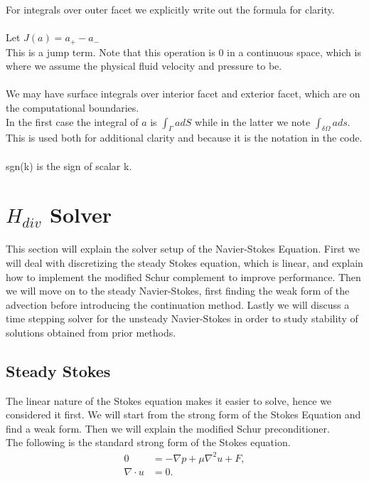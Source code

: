 \documentclass[11pt,twoside,a4paper]{article}
\begin{document}
For integrals over outer facet we explicitly write out the formula for clarity.\\
\\
Let $J(a) = a_+ - a_-$\\
This is a jump term. Note that this operation is $0$ in a continuous space, which is where we assume the physical fluid velocity and pressure to be.\\
\\
We may have surface integrals over interior facet and exterior facet, which are on the computational boundaries.\\
In the first case the integral of $a$ is $\int_\Gamma a dS$ while in the latter we note $\int_{\delta \Omega} a ds$.\\
This is used both for additional clarity and because it is the notation in the code.\\
\\
sgn(k) is the sign of scalar k.

\section{$H_{div}$ Solver}
This section will explain the solver setup of the Navier-Stokes Equation. First we will deal with discretizing the steady Stokes equation, which is linear, and explain how to implement the modified Schur complement to improve performance. Then we will move on to the steady Navier-Stokes, first finding the weak form of the advection before introducing the continuation method. Lastly we will discuss a time stepping solver for the unsteady Navier-Stokes in order to study stability of solutions obtained from prior methods.
\subsection{Steady Stokes}
The linear nature of the Stokes equation makes it easier to solve, hence we considered it first. We will start from the strong form of the Stokes Equation and find a weak form. Then we will explain the modified Schur preconditioner.\\
The following is the standard strong form of the Stokes equation.
\begin{align}
0 &= -\nabla p + \mu \nabla^2 u + F , \\
\nabla \cdot u &= 0 . \nonumber
\end{align}
\end{document}
